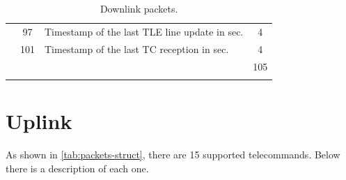 \begin{longtable}[c]{lcL{0.4\textwidth}c}
                                         & 97                & Timestamp of the last TLE line update in sec.        & 4                       \\
                                         & 101               & Timestamp of the last TC reception in sec.           & 4                       \\   
	                                     &                   &                                                      & 105                     \\
    \midrule
	\bottomrule[1.5pt]
	\caption{Downlink packets.}
	\label{tab:downlink-packets}
\end{longtable}

\section{Uplink} \label{sec:uplink-descr}

As shown in \autoref{tab:packets-struct}, there are 15 supported telecommands. Below there is a description of each one.

